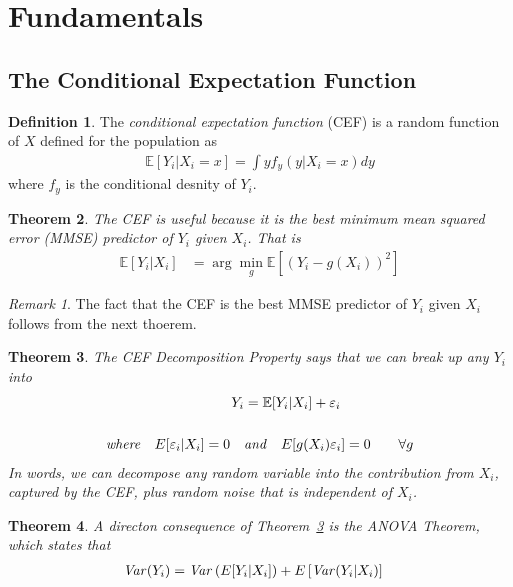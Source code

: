 \documentclass[12pt]{article}
\theoremstyle{plain}
\newtheorem{thm}{Theorem}[section]
\theoremstyle{definition}
\newtheorem{defn}[thm]{Definition}
\theoremstyle{remark}
\newtheorem*{rmk}{Remark}
\begin{document}
\section{Fundamentals}

\subsection{The Conditional Expectation Function}

\begin{defn}
The \emph{conditional expectation function} (CEF) is a random function
of $X$ defined for the population as
\begin{align*}
  \mathbb{E}[Y_i|X_i=x] = \int y f_y(y|X_i=x) dy
\end{align*}
where $f_y$ is the conditional desnity of $Y_i$.
\end{defn}

\begin{thm}
The CEF is useful because it is the best \emph{minimum mean squared
error} (MMSE) predictor of $Y_i$ given $X_i$. That is
\begin{align*}
  \mathbb{E}[Y_i|X_i]
  &= \arg \min_g \mathbb{E}\left[(Y_i-g(X_i))^2\right]
\end{align*}
\end{thm}

\begin{rmk}
The fact that the CEF is the best MMSE predictor of $Y_i$ given $X_i$ follows from the next thoerem.
\end{rmk}

\begin{thm}
\label{thm:cefdecomp}
The \emph{CEF Decomposition Property} says that we can break up any
$Y_i$ into
\begin{align*}
  Y_i &= \mathbb{E}[Y_i|X_i] + \varepsilon_i\\
  \\
  \text{\emph{where}}\quad
  E[\varepsilon_i|X_i] = 0 \quad &\text{\emph{and}}\quad
  E[g(X_i)\varepsilon_i] = 0 \qquad \forall g
\end{align*}
In words, we can decompose any random variable into the contribution
from $X_i$, captured by the CEF, plus random noise that is independent
of $X_i$.
\end{thm}

\begin{thm}
A directon consequence of Theorem~\ref{thm:cefdecomp} is the \emph{ANOVA
Theorem}, which states that
\begin{align*}
  \text{\text{\emph{Var}}}(Y_i)
  &= \text{\text{\emph{Var}}}\left(E[Y_i|X_i]\right)
  + E\left[\text{\text{\emph{Var}}}(Y_i|X_i)\right]
\end{align*}
\end{thm}
\end{document}
